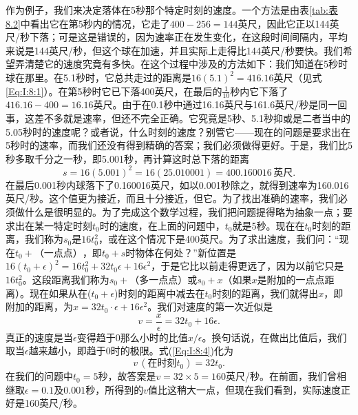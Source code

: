 \documentclass[12pt,oneside]{book}
\begin{document}
\begin{common-format}
作为例子，我们来决定落体在5秒那个特定时刻的速度。一个方法是由表\ref{tab:表8.2}中看出它在第5秒内的情况，它走了$400-256=144$英尺，因此它正以144英尺/秒下落；可是这是错误的，因为速率正在发生变化，在这段时间间隔内，平均来说是144英尺/秒，但这个球在加速，并且实际上走得比144英尺/秒要快。我们希望弄清楚它的速度究竟有多快。在这个过程中涉及的方法如下：我们知道在5秒时球在那里。在5.1秒时，它总共走过的距离是$16(5.1)^2=416.16$英尺（见式\ref{Eq:I:8:1}）。在第5秒时它已下落400英尺，在最后的$\frac{1}{10}$秒内它下落了$416.16-400=16.16$英尺。由于在0.1秒中通过16.16英尺与161.6英尺/秒是同一回事，这差不多就是速率，但还不完全正确。它究竟是5秒、5.1秒抑或是二者当中的5.05秒时的速度呢？或者说，什么时刻的速度？别管它——现在的问题是要求出在5秒时的速率，而我们还没有得到精确的答案；我们必须做得更好。于是，我们比5秒多取千分之一秒，即5.001秒，再计算这时总下落的距离
\begin{equation*}
s=16(5.001)^2=16(25.010001)=400.160016 \,\textrm{英尺}.
\end{equation*}
在最后0.001秒内球落下了0.160016英尺，如以0.001秒除之，就得到速率为160.016英尺/秒。这个值更为接近，而且十分接近，但它。为了找出准确的速率，我们必须做什么是很明显的。为了完成这个数学过程，我们把问题提得略为抽象一点；要求出在某一特定时刻$t_0$时的速度，在上面的问题中，$t_0$就是5秒。现在在$t_0$时刻的距离，我们称为$s_0$是$16t_0^2$，或在这个情况下是400英尺。为了求出速度，我们问：“现在$t_0+\textrm{（一点点）}$，即$t_0+s$时物体在何处？”新位置是$16(t_0+\epsilon)^2=16t_0^2+32t_0\epsilon+16\epsilon^2$，于是它比以前走得更远了，因为以前它只是$16t_0^2$。这段距离我们称为$s_0+\textrm{（多一点点）}$或$s_0+x$（如果$x$是附加的一点点距离）。现在如果从在($t_0+\epsilon$)时刻的距离中减去在$t_0$时刻的距离，我们就得出$x$，即附加的距离，为$x=32t_0\cdot\epsilon+16\epsilon^2$。我们对速度的第一次近似是
\begin{equation}
\label{Eq:I:8:4}
v=\frac{x}{\epsilon}=32t_0+16\epsilon.
\end{equation}
真正的速度是当$\epsilon$变得趋于0那么小时的比值$x/\epsilon$。换句话说，在做出比值后，我们取当$\epsilon$越来越小，即趋于0时的极限。式(\ref{Eq:I:8:4})化为
\begin{equation*}
v\,(\textrm{在时刻$t_0$})=32t_0.
\end{equation*}
在我们的问题中$t_0=5$秒，故答案是$v=32\times5=160$英尺/秒。在前面，我们曾相继取$\epsilon=0.1$及$0.001$秒，所得到的$v$值比这稍大一点，但现在我们看到，实际速度正好是160英尺/秒。





\end{common-format}
\end{document}
